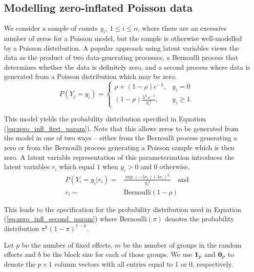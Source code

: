\subsection{Modelling zero-inflated Poisson data}

We consider a sample of counts $y_i$, $1 \le i\le n$, where there are an
excessive number of zeros for a Poisson model, but the sample is otherwise
well-modelled by a Poisson distribution. A popular approach using latent
variables views the data as the product of two data-generating processes, a
Bernoulli process that determines whether the data is definitely zero, and a
second process where data is generated from a Poisson distribution which may be
zero.
\begin{equation}
\label{eq:zero_infl_first_param}
	P(Y_j = y_i) = \left\{ \begin{array}{ll}
        \rho + (1 - \rho) e^{-\lambda},  & y_i = 0 \\
	    (1 - \rho) \frac{\lambda^{y_i} e^{-\lambda}} {y_i!},  &y_i \ge 1.
	\end{array} \right.
\end{equation}

This model yields the probability distribution specified in Equation
(\ref{eq:zero_infl_first_param}).  Note that this allows zeros to be generated
from the model in one of two ways -- either from the Bernoulli process
generating a zero or from the Bernoulli process generating a Poisson sample
which is then zero. A latent variable representation of this parameterization
introduces the latent variables $r_i$ which equal $1$ when $y_i>0$ and $0$
otherwise. 
\begin{equation}
\label{eq:zero_infl_second_param}
\begin{array}{rl}
	P(Y_i=y_i|r_i) = & \frac{\exp(-\lambda r_i)(\lambda r_i)^{y_i}}{y_i!} \quad \mbox{and} \\
	r_i \sim & \mbox{Bernoulli}(1-\rho)
\end{array}
\end{equation}

\noindent This leads to the specification for the probability distribution used
in Equation (\ref{eq:zero_infl_second_param}) where $\text{Bernoulli}(\pi)$
denotes the probability distribution $\pi^k (1 - \pi)^{1-k}$.

Let $p$ be the number of fixed effects, $m$ be the number of groups in the
random effects and $b$ be the block size for each of those groups. We use
${\bf 1}_p$ and ${\bf 0}_p$ to denote the $p \times 1$ column vectors with all
entries equal to 1 or 0, respectively.

